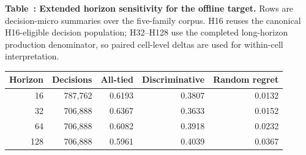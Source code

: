 \begin{center}
  \begin{minipage}{0.96\textwidth}
  \centering
  \label{tab:long-horizon-sensitivity}
  \small
  \textbf{Table~\thetable: Extended horizon sensitivity for the offline
  target.} Rows are decision-micro summaries over the five-family corpus. H16
  reuses the canonical H16-eligible decision population; H32--H128 use the
  completed long-horizon production denominator, so paired cell-level deltas
  are used for within-cell interpretation.

  \medskip
  \begin{tabular}{rrrrr}
    \toprule
    Horizon & Decisions & All-tied & Discriminative & Random regret \\
    \midrule
    16  & 787{,}762 & 0.6193 & 0.3807 & 0.0132 \\
    32  & 706{,}888 & 0.6367 & 0.3633 & 0.0152 \\
    64  & 706{,}888 & 0.6082 & 0.3918 & 0.0232 \\
    128 & 706{,}888 & 0.5961 & 0.4039 & 0.0367 \\
    \bottomrule
  \end{tabular}
  \end{minipage}
\end{center}

